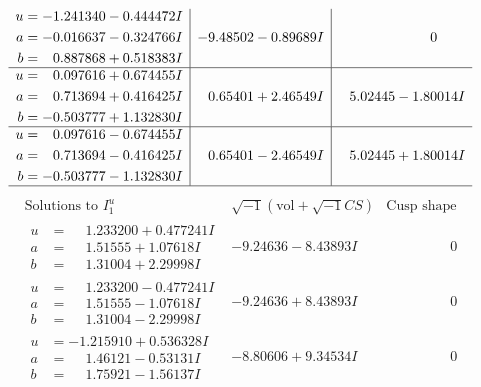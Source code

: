 \documentclass[1p]{elsarticle_modified}
\theoremstyle{definition}
\newcommand{\I}{\sqrt{-1}}
\begin{document}
$$\begin{array}{c|c|c}
\begin{aligned}
u &= -1.241340 - 0.444472 I \\
a &= -0.016637 - 0.324766 I \\
b &= \phantom{-}0.887868 + 0.518383 I\end{aligned}
 & -9.48502 - 0.89689 I & \phantom{-0.000000 } 0 \\ \hline\begin{aligned}
u &= \phantom{-}0.097616 + 0.674455 I \\
a &= \phantom{-}0.713694 + 0.416425 I \\
b &= -0.503777 + 1.132830 I\end{aligned}
 & \phantom{-}0.65401 + 2.46549 I & \phantom{-}5.02445 - 1.80014 I \\ \hline\begin{aligned}
u &= \phantom{-}0.097616 - 0.674455 I \\
a &= \phantom{-}0.713694 - 0.416425 I \\
b &= -0.503777 - 1.132830 I\end{aligned}
 & \phantom{-}0.65401 - 2.46549 I & \phantom{-}5.02445 + 1.80014 I\\
 \hline 
 \end{array}$$\newpage$$\begin{array}{c|c|c}  
\text{Solutions to }I^u_{1}& \I (\text{vol} + \sqrt{-1}CS) & \text{Cusp shape}\\
 \hline 
\begin{aligned}
u &= \phantom{-}1.233200 + 0.477241 I \\
a &= \phantom{-}1.51555 + 1.07618 I \\
b &= \phantom{-}1.31004 + 2.29998 I\end{aligned}
 & -9.24636 - 8.43893 I & \phantom{-0.000000 } 0 \\ \hline\begin{aligned}
u &= \phantom{-}1.233200 - 0.477241 I \\
a &= \phantom{-}1.51555 - 1.07618 I \\
b &= \phantom{-}1.31004 - 2.29998 I\end{aligned}
 & -9.24636 + 8.43893 I & \phantom{-0.000000 } 0 \\ \hline\begin{aligned}
u &= -1.215910 + 0.536328 I \\
a &= \phantom{-}1.46121 - 0.53131 I \\
b &= \phantom{-}1.75921 - 1.56137 I\end{aligned}
 & -8.80606 + 9.34534 I & \phantom{-0.000000 } 0 \\ \hline\begin{aligned}

\end{aligned}
\end{array}$$
\end{document}
